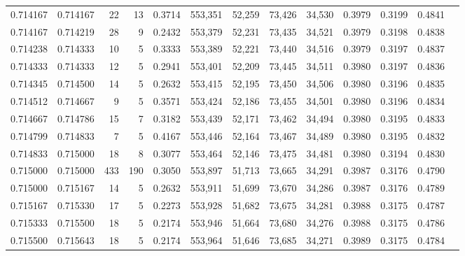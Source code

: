 \begin{tabular}{rrrrrrrrrrrrr}
0.714167 & 0.714167 &    22 &  13 &                                     0.3714 & 553,351 &  52,259 &  73,426 &  34,530 & 0.3979 & 0.3199 & 0.4841 \\
0.714167 & 0.714219 &    28 &   9 &                                     0.2432 & 553,379 &  52,231 &  73,435 &  34,521 & 0.3979 & 0.3198 & 0.4838 \\
0.714238 & 0.714333 &    10 &   5 &                                     0.3333 & 553,389 &  52,221 &  73,440 &  34,516 & 0.3979 & 0.3197 & 0.4837 \\
0.714333 & 0.714333 &    12 &   5 &                                     0.2941 & 553,401 &  52,209 &  73,445 &  34,511 & 0.3980 & 0.3197 & 0.4836 \\
0.714345 & 0.714500 &    14 &   5 &                                     0.2632 & 553,415 &  52,195 &  73,450 &  34,506 & 0.3980 & 0.3196 & 0.4835 \\
0.714512 & 0.714667 &     9 &   5 &                                     0.3571 & 553,424 &  52,186 &  73,455 &  34,501 & 0.3980 & 0.3196 & 0.4834 \\
0.714667 & 0.714786 &    15 &   7 &                                     0.3182 & 553,439 &  52,171 &  73,462 &  34,494 & 0.3980 & 0.3195 & 0.4833 \\
0.714799 & 0.714833 &     7 &   5 &                                     0.4167 & 553,446 &  52,164 &  73,467 &  34,489 & 0.3980 & 0.3195 & 0.4832 \\
0.714833 & 0.715000 &    18 &   8 &                                     0.3077 & 553,464 &  52,146 &  73,475 &  34,481 & 0.3980 & 0.3194 & 0.4830 \\
0.715000 & 0.715000 &   433 & 190 &                                     0.3050 & 553,897 &  51,713 &  73,665 &  34,291 & 0.3987 & 0.3176 & 0.4790 \\
0.715000 & 0.715167 &    14 &   5 &                                     0.2632 & 553,911 &  51,699 &  73,670 &  34,286 & 0.3987 & 0.3176 & 0.4789 \\
0.715167 & 0.715330 &    17 &   5 &                                     0.2273 & 553,928 &  51,682 &  73,675 &  34,281 & 0.3988 & 0.3175 & 0.4787 \\
0.715333 & 0.715500 &    18 &   5 &                                     0.2174 & 553,946 &  51,664 &  73,680 &  34,276 & 0.3988 & 0.3175 & 0.4786 \\
0.715500 & 0.715643 &    18 &   5 &                                     0.2174 & 553,964 &  51,646 &  73,685 &  34,271 & 0.3989 & 0.3175 & 0.4784 \\

\end{tabular}
